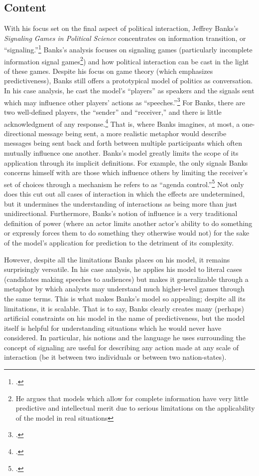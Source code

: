 \documentclass{article}
\begin{document}
\subsection{Content}
With his focus set on the final aspect of political interaction, Jeffrey Banks's \emph{Signaling Games in Political Science} concentrates on information transition, or ``signaling.''\footcite{banks91} 
Banks's analysis focuses on signaling games (particularly incomplete information signal games\footnote{He argues that models which allow for complete information have very little predictive and intellectual merit due to serious limitations on the applicability of the model in real situations}) and how political interaction can be cast in the light of these games. 
Despite his focus on game theory (which emphasizes predictiveness), Banks still offers a prototypical model of politics as conversation. 
In his case analysis, he cast the model's ``players'' as speakers and the signals sent which may influence other players' actions as ``speeches.''\footcite[37]{banks91} 
For Banks, there are two well-defined players, the ``sender'' and ``receiver,'' and there is little acknowledgment of any response.\footcite[4]{banks91} 
That is, where Banks imagines, at most, a one-directional message being sent, a more realistic metaphor would describe messages being sent back and forth between multiple participants which often mutually influence one another. 
Banks's model greatly limits the scope of its application through its implicit definitions. 
For example, the only signals Banks concerns himself with are those which influence others by limiting the receiver's set of choices through a mechanism he refers to as ``agenda control.''\footcite[3]{banks91} 
Not only does this cut out all cases of interaction in which the effects are undetermined, but it undermines the understanding of interactions as being more than just unidirectional. 
Furthermore, Banks's notion of influence is a very traditional definition of power (where an actor limits another actor's ability to do something or expressly forces them to do something they otherwise would not) for the sake of the model's application for prediction to the detriment of its complexity. 

However, despite all the limitations Banks places on his model, it remains surprisingly versatile. 
In his case analysis, he applies his model to literal cases (candidates making speeches to audiences) but makes it generalizable through a metaphor by which analysts may understand much higher-level games through the same terms. 
This is what makes Banks's model so appealing; despite all its limitations, it is scalable.
That is to say, Banks clearly creates many (perhaps) artificial constraints on his model in the name of predictiveness, but the model itself is helpful for understanding situations which he would never have considered.
In particular, his notions and the language he uses surrounding the concept of signaling are useful for describing any action made at any scale of interaction (be it between two individuals or between two nation-states).
\end{document}
